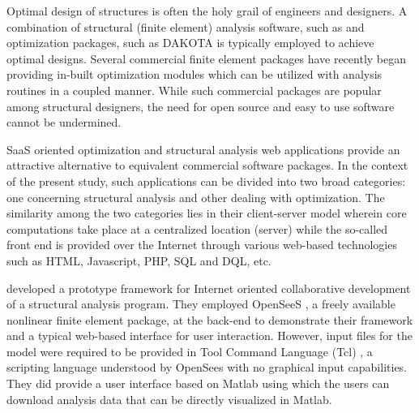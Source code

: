 \documentclass[preprint]{elsarticle}
\begin{document}
Optimal design of structures is often the holy grail of engineers and designers. 
A combination of structural (finite element) analysis
software, such as \citet{ANSYS} and optimization packages, such as DAKOTA
\cite{adams2006dakota} is typically employed to achieve optimal designs. Several
commercial finite element packages have recently began providing in-built
optimization modules which can be utilized with analysis routines in a coupled
manner. While such commercial packages are popular among structural designers,
the need for open source and easy to use software cannot be undermined.

SaaS oriented optimization and structural analysis web applications provide an
attractive alternative to equivalent commercial
software packages. In the context of the present study, such applications can be
divided into two broad categories: one concerning structural analysis and
other dealing with optimization. The similarity among the two categories lies in their
client-server model wherein core computations take place at a centralized
location (server) while the so-called front end is provided over the Internet
through various web-based technologies such as HTML, Javascript, PHP, SQL and
DQL, etc.

\citet{peng2002prototype} developed a prototype framework for
Internet oriented collaborative development of a structural analysis program.
They employed OpenSeeS \cite{OpenSeeS}, a freely available nonlinear finite
element package, at the back-end to demonstrate their framework and a typical
web-based interface for user interaction. However, input files for the model
were required to be provided in Tool Command Language (Tcl) \cite{tcl}, a
scripting language understood by OpenSees with no graphical input capabilities.
They did provide a user interface based on Matlab \cite{matlab} using which the
users can download analysis data that can be directly visualized in Matlab.
\end{document}
